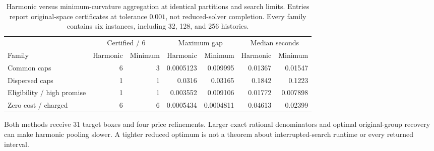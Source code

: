 \begin{table}[p]\centering
\caption{Harmonic versus minimum-curvature aggregation at identical partitions and search limits. Entries report original-space certificates at tolerance $0.001$, not reduced-solver completion. Every family contains six instances, including 32, 128, and 256 histories.}\label{tab:r48-paired}
\begin{tabular}{lrrrrrr}\toprule
& \multicolumn{2}{c}{Certified / 6}&\multicolumn{2}{c}{Maximum gap}&\multicolumn{2}{c}{Median seconds}\\
Family & Harmonic & Minimum & Harmonic & Minimum & Harmonic & Minimum\\\midrule
Common caps & 6 & 3 & 0.0005123 & 0.009995 & 0.01367 & 0.01547 \\
Dispersed caps & 1 & 1 & 0.0316 & 0.03165 & 0.1842 & 0.1223 \\
Eligibility / high promise & 1 & 1 & 0.003552 & 0.009106 & 0.01772 & 0.007898 \\
Zero cost / charged & 6 & 6 & 0.0005434 & 0.0004811 & 0.04613 & 0.02399 \\
\bottomrule\end{tabular}
\par\small Both methods receive 31 target boxes and four price refinements. Larger exact rational denominators and optimal original-group recovery can make harmonic pooling slower. A tighter reduced optimum is not a theorem about interrupted-search runtime or every returned interval.
\end{table}
